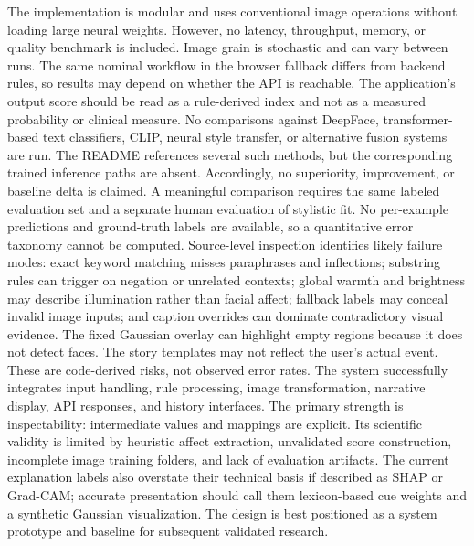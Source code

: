 \documentclass[conference]{IEEEtran}
\begin{document}
{}\markdownRendererSectionEnd \markdownRendererSectionBegin
{}\markdownRendererInterblockSeparator
{}The implementation is modular and uses conventional image operations without loading large neural weights. However, no latency, throughput, memory, or quality benchmark is included. Image grain is stochastic and can vary between runs. The same nominal workflow in the browser fallback differs from backend rules, so results may depend on whether the API is reachable. The application’s output score should be read as a rule-derived index and not as a measured probability or clinical measure.\markdownRendererInterblockSeparator
{}
\markdownRendererSectionEnd \markdownRendererSectionBegin
{}\markdownRendererInterblockSeparator
{}No comparisons against DeepFace, transformer-based text classifiers, CLIP, neural style transfer, or alternative fusion systems are run. The README references several such methods, but the corresponding trained inference paths are absent. Accordingly, no superiority, improvement, or baseline delta is claimed. A meaningful comparison requires the same labeled evaluation set and a separate human evaluation of stylistic fit.\markdownRendererInterblockSeparator
{}
\markdownRendererSectionEnd \markdownRendererSectionBegin
{}\markdownRendererInterblockSeparator
{}No per-example predictions and ground-truth labels are available, so a quantitative error taxonomy cannot be computed. Source-level inspection identifies likely failure modes: exact keyword matching misses paraphrases and inflections; substring rules can trigger on negation or unrelated contexts; global warmth and brightness may describe illumination rather than facial affect; fallback labels may conceal invalid image inputs; and caption overrides can dominate contradictory visual evidence. The fixed Gaussian overlay can highlight empty regions because it does not detect faces. The story templates may not reflect the user’s actual event. These are code-derived risks, not observed error rates.\markdownRendererInterblockSeparator
{}
\markdownRendererSectionEnd \markdownRendererSectionBegin
{}\markdownRendererInterblockSeparator
{}The system successfully integrates input handling, rule processing, image transformation, narrative display, API responses, and history interfaces. The primary strength is inspectability: intermediate values and mappings are explicit. Its scientific validity is limited by heuristic affect extraction, unvalidated score construction, incomplete image training folders, and lack of evaluation artifacts. The current explanation labels also overstate their technical basis if described as SHAP or Grad-CAM; accurate presentation should call them lexicon-based cue weights and a synthetic Gaussian visualization. The design is best positioned as a system prototype and baseline for subsequent validated research.\markdownRendererInterblockSeparator
\end{document}
